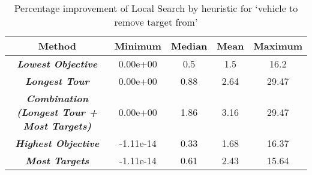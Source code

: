 \begin{table}[htb!]
	\centering
	\begin{tabular}{|c|c|c|c|c|}
	\hline
	\textbf{Method} & \textbf{Minimum} & \textbf{Median} & \textbf{Mean} & \textbf{Maximum} \\\hline
	\textit\textbf{{Lowest Objective}} & 0.00e+00 & 0.5 & 1.5 & 16.2\\\hline
	\textit\textbf{{Longest Tour}} & 0.00e+00 & 0.88 & 2.64 & 29.47\\\hline
	\textit\textbf{{Combination (Longest Tour + Most Targets)}} & 0.00e+00 & 1.86 & 3.16 & 29.47\\\hline
	\textit\textbf{{Highest Objective}} & -1.11e-14 & 0.33 & 1.68 & 16.37\\\hline
	\textit\textbf{{Most Targets}} & -1.11e-14 & 0.61 & 2.43 & 15.64\\\hline
	\end{tabular}
\caption{Percentage improvement of Local Search by heuristic for \lq vehicle to remove target from\rq}
\label{tab:percentage_improvement}
\end{table}